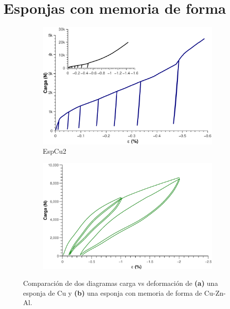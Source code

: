 \documentclass[a4paper,12pt,fleqn,twoside,openany]{book}
\begin{document}






\section{Esponjas con memoria de forma }
\label{sec:SMF}

\begin{figure}[h]
 \centering
    \begin{subfigure}{0.49\textwidth}
        \includegraphics[width=\textwidth]{Img/Introduccion/Cucompararesponja.eps}
        \caption{EspCu2}
        \label{fig:}
    \end{subfigure}
    \begin{subfigure}{0.45\textwidth}
        \includegraphics[width=\textwidth]{Img/Introduccion/EsponjacompararCu.eps}
        \caption{}
        \label{fig:EspA}
    \end{subfigure}

  \label{fig: proceso}
  \caption{Comparación de dos diagramas carga vs deformación de \textbf{(a)} una esponja de Cu y \textbf{(b)} una esponja con memoria de forma de Cu-Zn-Al.}
\end{figure}
\end{document}
